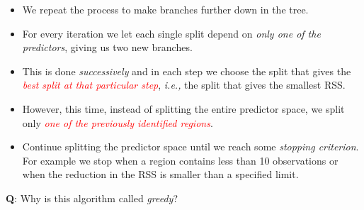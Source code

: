 \documentclass[10pt,ignorenonframetext,]{beamer}
\begin{document}
\begin{frame}

\begin{itemize}
\item
  We repeat the process to make branches further down in the tree.
\item
  For every iteration we let each single split depend on \emph{only one
  of the predictors}, giving us two new branches.
\item
  This is done \emph{successively} and in each step we choose the split
  that gives the
  \emph{\textcolor{red}{best split at that particular step}},
  \emph{i.e.,} the split that gives the smallest RSS.
\item
  However, this time, instead of splitting the entire predictor space,
  we split only
  \emph{\textcolor{red}{one of the previously identified regions}}.
\item
  Continue splitting the predictor space until we reach some
  \emph{stopping criterion}. For example we stop when a region contains
  less than 10 observations or when the reduction in the RSS is smaller
  than a specified limit.
\end{itemize}

\vspace{1mm}

\textbf{Q}: Why is this algorithm called \emph{greedy}?

\end{frame}
\end{document}
